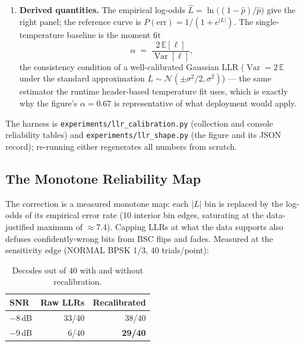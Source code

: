 \begin{enumerate}
          $[\,0.5/N,\; 1 - 0.5/N\,]$ (a half-count continuity
          correction that keeps the log-odds finite when a bin has no
          errors), and the bin's abscissa is its mean $|\ell|$.
    \item \textbf{Derived quantities.}  The empirical log-odds
          $\hat{L} = \ln\bigl((1-\hat{p})/\hat{p}\bigr)$ give the
          right panel; the reference curve is
          $P(\mathrm{err}) = 1/(1+e^{|L|})$.  The single-temperature
          baseline is the moment fit
          \begin{equation}
              \alpha \;=\; \frac{2\,\mathbb{E}[\ell]}
                                {\operatorname{Var}[\ell]},
          \end{equation}
          the consistency condition of a well-calibrated Gaussian LLR
          ($\operatorname{Var} = 2\,\mathbb{E}$ under the standard
          approximation $L \sim \mathcal{N}(\pm\sigma^2/2, \sigma^2)$)
          --- the same estimator the runtime header-based temperature
          fit uses, which is exactly why the figure's $\alpha = 0.67$
          is representative of what deployment would apply.
\end{enumerate}

The harness is \texttt{experiments/llr\_calibration.py} (collection
and console reliability tables) and \texttt{experiments/llr\_shape.py}
(the figure and its JSON record); re-running either regenerates all
numbers from scratch.

\subsection{The Monotone Reliability Map}

The correction is a measured monotone map: each $|L|$ bin is replaced
by the log-odds of its empirical error rate (10 interior bin edges,
saturating at the data-justified maximum of $\approx$7.4).  Capping
LLRs at what the data supports also defuses confidently-wrong bits
from BSC flips and fades.  Measured at the sensitivity edge (NORMAL
BPSK 1/3, 40 trials/point):

\begin{table}[H]
    \centering
    \caption{Decodes out of 40 with and without recalibration.}
    \label{tab:recal}
    \small
    \begin{tabular}{@{}lrr@{}}
    \toprule
    \textbf{SNR} & \textbf{Raw LLRs} & \textbf{Recalibrated} \\
    \midrule
    $-8$\,dB & 33/40 & 38/40 \\
    $-9$\,dB & 6/40  & \textbf{29/40} \\
    \bottomrule
    \end{tabular}
\end{table}

